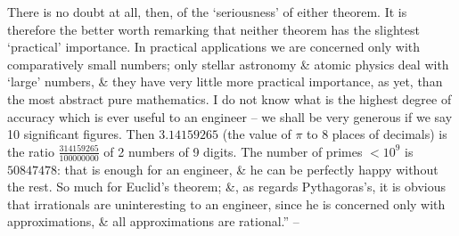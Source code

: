 \documentclass{article}
\numberwithin{equation}{section}
\begin{document}
There is no doubt at all, then, of the `seriousness' of either theorem. It is therefore the better worth remarking that neither theorem has the slightest `practical' importance. In practical applications we are concerned only with comparatively small numbers; only stellar astronomy \& atomic physics deal with `large' numbers, \& they have very little more practical importance, as yet, than the most abstract pure mathematics. I do not know what is the highest degree of accuracy which is ever useful to an engineer -- we shall be very generous if we say 10 significant figures. Then $3.14159265$ (the value of $\pi$ to 8 places of decimals) is the ratio $\frac{314159265}{100000000}$ of 2 numbers of 9 digits. The number of primes $<10^9$ is $50847478$: that is enough for an engineer, \& he can be perfectly happy without the rest. So much for Euclid's theorem; \&, as regards Pythagoras's, it is obvious that irrationals are uninteresting to an engineer, since he is concerned only with approximations, \& all approximations are rational.'' -- \cite[pp. 99--102]{Hardy1992}


\printbibliography[heading=bibintoc]
	
\end{document}
